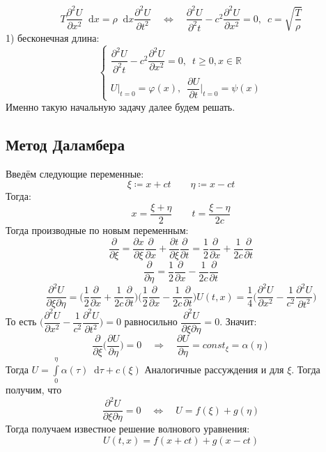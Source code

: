 \documentclass[11pt,a4paper]{report}
\numberwithin{equation}{section}
\numberwithin{figure}{chapter}
\numberwithin{table}{chapter}
\newcommand{\R}{\mathbb{R}}
\newcommand{\dd}{\mathop{}\!\mathrm{d}}
\renewcommand{\phi}{\varphi}
\begin{document}
\[T\dfrac{\partial^2 U}{\partial x^2}\dd x=\rho \dd x\dfrac{\partial^2 U}{\partial t^2} \quad \Leftrightarrow \quad \dfrac{\partial^2 U}{\partial^2 t}-c^2\dfrac{\partial^2 U}{\partial x^2}=0, \,\,\, c=\sqrt{\dfrac{T}{\rho}}\]
1) бесконечная длина: 
\begin{equation}
\label{volna}
\begin{cases}
    \dfrac{\partial^2 U}{\partial^2 t}-c^2\dfrac{\partial^2 U}{\partial x^2}=0, \,\,\, t\geq0, x\in\R \\
    U\big|_{t=0}=\phi(x), \,\,\, \dfrac{\partial U}{\partial t}\bigg|_{t=0}=\psi(x)
 \end{cases}
\end{equation}
Именно такую начальную задачу далее будем решать.


\subsection{Метод Даламбера}
Введём следующие переменные: \[\xi\coloneqq x+ct \qquad \eta\coloneqq x-ct \]
Тогда: \[x=\dfrac{\xi+\eta}{2} \qquad t=\dfrac{\xi-\eta}{2c}\]
Тогда производные по новым переменным: 
\[\dfrac{\partial}{\partial \xi}=\dfrac{\partial x}{\partial \xi}\dfrac{\partial}{\partial x}+\dfrac{\partial t}{\partial \xi}\dfrac{\partial}{\partial t}=\dfrac{1}{2}\dfrac{\partial}{\partial x}+\dfrac{1}{2c}\dfrac{\partial}{\partial t}\]
\[\dfrac{\partial}{\partial \eta}=\dfrac{1}{2}\dfrac{\partial}{\partial x}-\dfrac{1}{2c}\dfrac{\partial}{\partial t}\]
\[\dfrac{\partial^2 U}{\partial \xi \partial \eta}=\bigg(\dfrac{1}{2}\dfrac{\partial}{\partial x}+\dfrac{1}{2c}\dfrac{\partial}{\partial t}\bigg)\bigg(\dfrac{1}{2}\dfrac{\partial}{\partial x}-\dfrac{1}{2c}\dfrac{\partial}{\partial t}\bigg)U(t,x)=\dfrac{1}{4}\bigg(\dfrac{\partial^2 U}{\partial x^2}-\dfrac{1}{c^2}\dfrac{\partial^2 U}{\partial t^2}\bigg)\]
То есть $\bigg(\dfrac{\partial^2 U}{\partial x^2}-\dfrac{1}{c^2}\dfrac{\partial^2 U}{\partial t^2}\bigg)=0$ равносильно $\dfrac{\partial^2 U}{\partial \xi \partial \eta}=0$. Значит:
\[\dfrac{\partial }{\partial \xi}\bigg(\dfrac{\partial U}{\partial \eta}\bigg)=0 \quad \Rightarrow \quad \dfrac{\partial U}{\partial \eta}=const_\xi=\alpha(\eta)\]
Тогда \(U=\int\limits_{0}^{\eta}\alpha(\tau)\dd \tau + c(\xi)\)
Аналогичные рассуждения и для $\xi$. Тогда получим, что 
\[\dfrac{\partial^2 U}{\partial \xi\partial \eta}=0 \quad \Leftrightarrow \quad U=f(\xi)+g(\eta)\]
Тогда получаем известное решение волнового уравнения: 
\begin{equation}
\label{volnasol}
U(t,x)=f(x+ct)+g(x-ct)
\end{equation}
\end{document}
